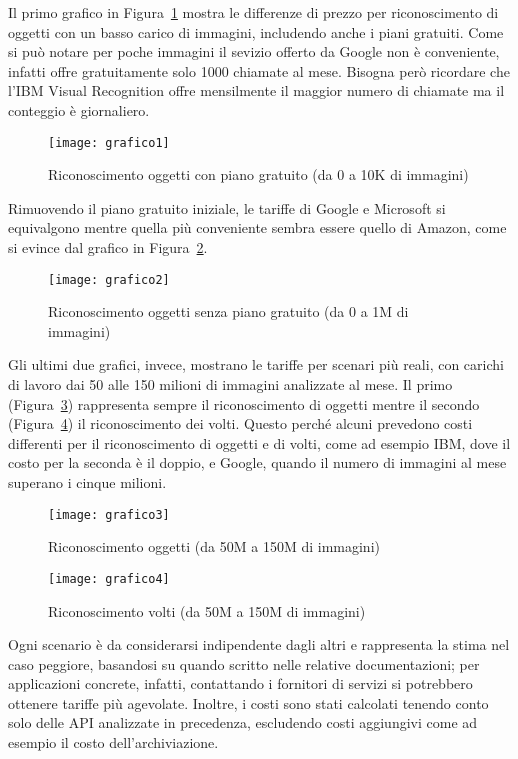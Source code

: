 Il primo grafico in Figura~\ref{fig:grafico1} mostra le differenze di prezzo per riconoscimento di oggetti con un basso carico di immagini, includendo anche i piani gratuiti.
Come si può notare per poche immagini il sevizio offerto da Google non è conveniente, infatti offre gratuitamente solo 1000 chiamate al mese.
Bisogna però ricordare che l'IBM Visual Recognition offre mensilmente il maggior numero di chiamate ma il conteggio è giornaliero.
\begin{figure}[!h]
\begin{center}
	\texttt{[image: grafico1]}
{\scriptsize
\caption{Riconoscimento oggetti con piano gratuito (da 0 a 10K di immagini)}
\label{fig:grafico1}}
\end{center}
\end{figure}
%
%
Rimuovendo il piano gratuito iniziale, le tariffe di Google e Microsoft si equivalgono mentre quella più conveniente sembra essere quello di Amazon,
come si evince dal grafico in Figura~\ref{fig:grafico2}.
\begin{figure}[!h]
\begin{center}
	\texttt{[image: grafico2]}
{\scriptsize \caption{Riconoscimento oggetti senza piano gratuito (da 0 a 1M di immagini)}
\label{fig:grafico2}}
\end{center}
\end{figure}
%
%
Gli ultimi due grafici, invece, mostrano le tariffe per scenari più reali, con carichi di lavoro dai 50 alle 150 milioni di immagini analizzate al mese.
Il primo (Figura~\ref{fig:grafico3}) rappresenta sempre il riconoscimento di oggetti mentre il secondo (Figura~\ref{fig:grafico4}) il riconoscimento dei volti.
Questo perché alcuni prevedono costi differenti per il riconoscimento di oggetti e di volti, come ad esempio IBM, dove il costo per la seconda è il doppio,
e Google, quando il numero di immagini al mese superano i cinque milioni.
\begin{figure}[!h]
\begin{center}
	\texttt{[image: grafico3]}
{\scriptsize \caption{Riconoscimento oggetti (da 50M a 150M di immagini)}
\label{fig:grafico3}}
\end{center}
\end{figure}
%
\begin{figure}[!h]
\begin{center}
	\texttt{[image: grafico4]}
{\scriptsize \caption{Riconoscimento volti (da 50M a 150M di immagini)}
\label{fig:grafico4}}
\end{center}
\end{figure}
%
%

Ogni scenario è da considerarsi indipendente dagli altri e rappresenta la stima nel caso peggiore, basandosi su quando scritto nelle relative documentazioni;
per applicazioni concrete, infatti, contattando i fornitori di servizi si potrebbero ottenere tariffe più agevolate.
Inoltre, i costi sono stati calcolati tenendo conto solo delle API analizzate in precedenza, escludendo costi aggiungivi come ad esempio il costo dell'archiviazione.
%
%
